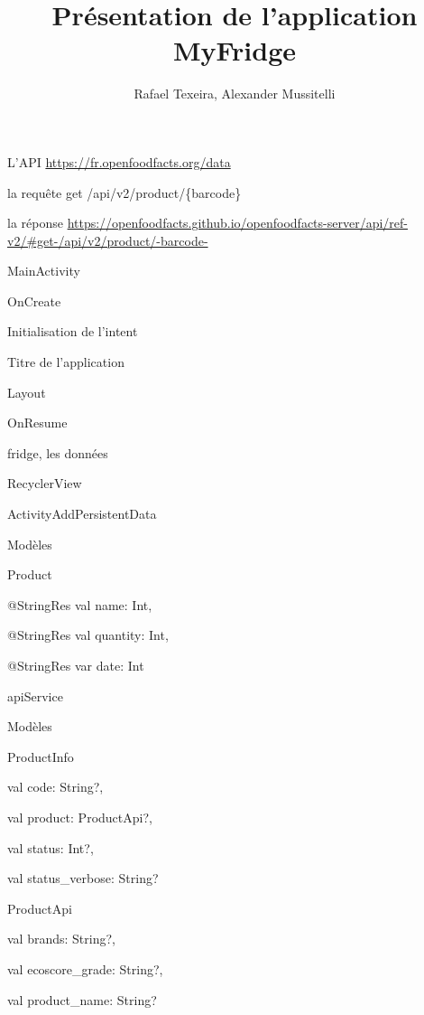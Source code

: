 \documentclass{beamer}
\title{Présentation de l'application MyFridge}
\author{Rafael Texeira, Alexander Mussitelli}
\begin{document}
\begin{frame}[plain]
    \maketitle
\end{frame}
\begin{frame}{L'API}
	\url{https://fr.openfoodfacts.org/data}
	
	\begin{block}{la requête}
		get /api/v2/product/\{barcode\}
	\end{block}
	\begin{block}{la réponse}
		\url{https://openfoodfacts.github.io/openfoodfacts-server/api/ref-v2/#get-/api/v2/product/-barcode-}	
	\end{block}
\end{frame}
\begin{frame}{MainActivity}
	\begin{block}{OnCreate}
		\item Initialisation de l'intent
		\item Titre de l'application
		\item Layout
	\end{block}
	\begin{block}{OnResume}
		\item fridge, les données
		\item RecyclerView
	\end{block}		
\end{frame}
\begin{frame}{ActivityAddPersistentData}
	
\end{frame}
\begin{frame}{Modèles}
	\begin{block}{Product}
		\item @StringRes val name: Int,
		\item @StringRes val quantity: Int,
		\item @StringRes var date: Int
	\end{block}
\end{frame}
\begin{frame}{apiService}
	
\end{frame}
\begin{frame}{Modèles}
	\begin{block}{ProductInfo}
		\item val code: String?,
		\item val product: ProductApi?,
		\item val status: Int?,
		\item val status\_verbose: String?
	\end{block}
	\begin{block}{ProductApi}
		\item val brands: String?,
		\item val ecoscore\_grade: String?,
		\item val product\_name: String?
	\end{block}
\end{frame}
\end{document}
